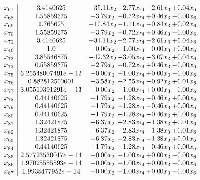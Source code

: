 \documentclass[8pt]{article}
\begin{document}
\[\begin{array}{c| c c@{\hskip 2pt} c@{\hskip 2pt} c@{\hskip 2pt} c@{\hskip 2pt} }
 x_{67}   &  3.4140625 & -35.11 x_{2} & +  2.77 x_{74} & -2.61 x_{3} & +  0.04 x_{6}\\
 x_{68}   &  1.55859375 & -3.79 x_{2} & +  0.72 x_{74} & +  0.46 x_{3} & -0.00 x_{6}\\
 x_{69}   &  0.765625 & -10.84 x_{2} & +  1.11 x_{74} & -0.84 x_{3} & +  0.02 x_{6}\\
 x_{70}   &  1.55859375 & -3.79 x_{2} & +  0.72 x_{74} & +  0.46 x_{3} & -0.00 x_{6}\\
 x_{71}   &  3.4140625 & -34.11 x_{2} & +  2.77 x_{74} & -2.61 x_{3} & +  0.04 x_{6}\\
 x_{46}   &  1.0 & +  0.00 x_{2} & +  1.00 x_{74} & -0.00 x_{3} & +  0.00 x_{6}\\
 x_{73}   &  3.85546875 & -42.32 x_{2} & +  3.05 x_{74} & -3.07 x_{3} & +  0.04 x_{6}\\
 x_{72}   &  0.55859375 & -2.79 x_{2} & +  0.72 x_{74} & +  0.46 x_{3} & -0.00 x_{6}\\
 x_{75}   &  6.25548007491e-12 & -0.00 x_{2} & +  1.00 x_{74} & +  0.00 x_{3} & -0.00 x_{6}\\
 x_{76}   &  0.882812500001 & +  3.58 x_{2} & +  2.55 x_{74} & -0.92 x_{3} & +  0.01 x_{6}\\
 x_{77}   &  3.05510391291e-13 & -0.00 x_{2} & +  1.00 x_{74} & +  0.00 x_{3} & -0.00 x_{6}\\
 x_{78}   &  0.44140625 & +  1.79 x_{2} & +  1.28 x_{74} & -0.46 x_{3} & +  0.00 x_{6}\\
 x_{79}   &  0.44140625 & +  1.79 x_{2} & +  1.28 x_{74} & -0.46 x_{3} & +  0.00 x_{6}\\
 x_{80}   &  0.44140625 & +  1.79 x_{2} & +  1.28 x_{74} & -0.46 x_{3} & +  0.00 x_{6}\\
 x_{81}   &  1.32421875 & +  6.37 x_{2} & +  2.83 x_{74} & -1.38 x_{3} & +  0.01 x_{6}\\
 x_{82}   &  1.32421875 & +  6.37 x_{2} & +  2.83 x_{74} & -1.38 x_{3} & +  0.01 x_{6}\\
 x_{83}   &  1.32421875 & +  6.37 x_{2} & +  2.83 x_{74} & -1.38 x_{3} & +  0.01 x_{6}\\
 x_{84}   &  0.44140625 & +  1.79 x_{2} & +  1.28 x_{74} & -0.46 x_{3} & +  0.00 x_{6}\\
 x_{85}   &  2.57723530017e-14 & -0.00 x_{2} & +  1.00 x_{74} & +  0.00 x_{3} & -0.00 x_{6}\\
 x_{86}   &  1.97025555593e-14 & -0.00 x_{2} & +  1.00 x_{74} & +  0.00 x_{3} & -0.00 x_{6}\\
 x_{87}   &  1.9938477952e-14 & -0.00 x_{2} & +  1.00 x_{74} & +  0.00 x_{3} & -0.00 x_{6}\\

\end{array}\]
\end{document}
